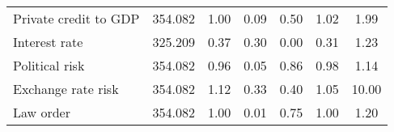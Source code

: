 \begin{longtable}{lcccccc}
\quad Private credit to GDP&      354.082&        1.00&        0.09&        0.50&        1.02&        1.99\\
\quad Interest rate    &      325.209&        0.37&        0.30&        0.00&        0.31&        1.23\\
\quad Political risk   &      354.082&        0.96&        0.05&        0.86&        0.98&        1.14\\
\quad Exchange rate risk&      354.082&        1.12&        0.33&        0.40&        1.05&       10.00\\
\quad Law order        &      354.082&        1.00&        0.01&        0.75&        1.00&        1.20\\
\hline
\end{longtable}
